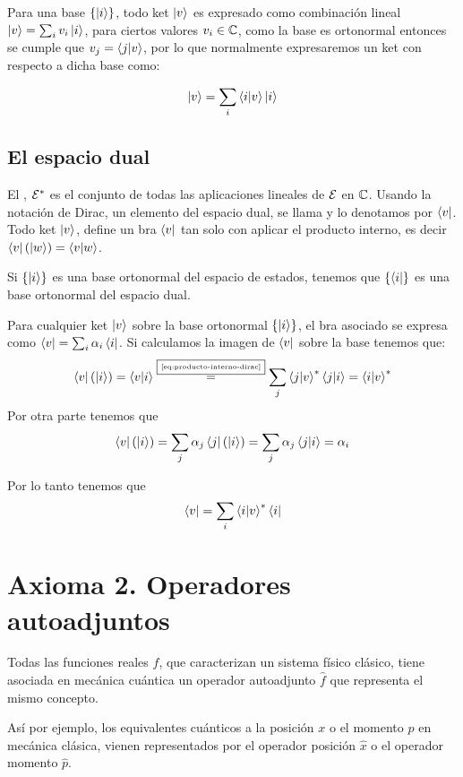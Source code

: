 Para una base $\qty{\ket{i}}$, todo ket $\ket{v}$ es expresado como combinación lineal $\ket{v}=\sum_{i} v_i\ket{i}$, para ciertos valores $v_i\in\mathbb{C}$, como la base es ortonormal entonces se cumple que $v_j=\braket{j}{v}$, por lo que normalmente expresaremos un ket con respecto a dicha base como:

\begin{equation}
	\label{eq:producto-interno-dirac}
	\ket{v}=\sum_i\braket{i}{v}\ket{i}
\end{equation}

\subsection{El espacio dual}\label{subsec:el-espacio-dual}
El , $\mathcal{E}^*$ es el conjunto de todas las aplicaciones lineales de $\mathcal{E}$ en $\mathbb{C}$.
Usando la notación de Dirac, un elemento del espacio dual, se llama  y lo denotamos por $\bra{v}$.
Todo ket $\ket{v}$, define un bra $\bra{v}$ tan solo con aplicar el producto interno, es decir $\bra{v}(\ket{w})=\braket{v}{w}$.

Si $\qty{\ket{i}}$ es una base ortonormal del espacio de estados, tenemos que $\qty{\bra{i}}$ es una base ortonormal del espacio dual.

Para cualquier ket $\ket{v}$ sobre la base ortonormal $\qty{\ket{i}}$, el bra asociado se expresa como $\bra{v}=\sum_{i}\alpha_i\bra{i}$.
Si calculamos la imagen de $\bra{v}$ sobre la base tenemos que:
\begin{equation*}
	\bra{v}(\ket{i})=\braket{v}{i}\overset{\fbox{\tiny \ref{eq:producto-interno-dirac}}}{=}\sum_{j}\braket{j}{v}^*\braket{j}{i} = \braket{i}{v}^*
\end{equation*}
Por otra parte tenemos que
\begin{equation*}
	\bra{v}(\ket{i})=\sum_{j}\alpha_j\bra{j}(\ket{i}) = \sum_{j}\alpha_j\braket{j}{i} = \alpha_i
\end{equation*}

Por lo tanto tenemos que
\begin{equation}
	\label{eq:dual_dirac}
	\bra{v}=\sum_i\braket{i}{v}^*\bra{i}
\end{equation}

\section{Axioma 2. Operadores autoadjuntos}\label{sec:axioma-2.-operadores-autoadjuntos}
\begin{definition}[Axioma 2]
	Todas las funciones reales $f$, que caracterizan un sistema físico clásico, tiene asociada en mecánica cuántica un operador autoadjunto $\hat{f}$ que representa el mismo concepto.
\end{definition}
Así por ejemplo, los equivalentes cuánticos a la posición $x$ o el momento $p$ en mecánica clásica, vienen representados por el operador posición $\hat{x}$ o el operador momento $\hat{p}$.

